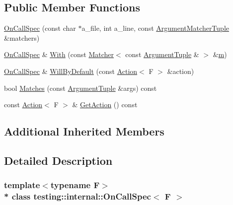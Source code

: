 \subsection*{Public Member Functions}
\begin{DoxyCompactItemize}
\item 
\hyperlink{classtesting_1_1internal_1_1_on_call_spec_ac7077e8162a10714e463b64a3cc7d054}{On\+Call\+Spec} (const char $\ast$a\+\_\+file, int a\+\_\+line, const \hyperlink{classtesting_1_1internal_1_1_on_call_spec_a3240f159f0a9d8cda208bc256da35074}{Argument\+Matcher\+Tuple} \&matchers)
\item 
\hyperlink{classtesting_1_1internal_1_1_on_call_spec}{On\+Call\+Spec} \& \hyperlink{classtesting_1_1internal_1_1_on_call_spec_a2421cc9ac5c954a3a4c9275c35771bad}{With} (const \hyperlink{classtesting_1_1_matcher}{Matcher}$<$ const \hyperlink{classtesting_1_1internal_1_1_on_call_spec_a70ffab8b915b7b48a90f5ce256da806f}{Argument\+Tuple} \& $>$ \&\hyperlink{variables__e_8js_aab4247b6acebcba996939b177f483c14}{m})
\item 
\hyperlink{classtesting_1_1internal_1_1_on_call_spec}{On\+Call\+Spec} \& \hyperlink{classtesting_1_1internal_1_1_on_call_spec_a1c6303bf46983f20f4d2a61752fa8663}{Will\+By\+Default} (const \hyperlink{classtesting_1_1_action}{Action}$<$ F $>$ \&action)
\item 
bool \hyperlink{classtesting_1_1internal_1_1_on_call_spec_a98603357e18be6450cd2154853bea3f7}{Matches} (const \hyperlink{classtesting_1_1internal_1_1_on_call_spec_a70ffab8b915b7b48a90f5ce256da806f}{Argument\+Tuple} \&args) const 
\item 
const \hyperlink{classtesting_1_1_action}{Action}$<$ F $>$ \& \hyperlink{classtesting_1_1internal_1_1_on_call_spec_ad560cd3f669be59d1159a962c76ba9b7}{Get\+Action} () const 
\end{DoxyCompactItemize}
\subsection*{Additional Inherited Members}


\subsection{Detailed Description}
\subsubsection*{template$<$typename F$>$\\*
class testing\+::internal\+::\+On\+Call\+Spec$<$ F $>$}



